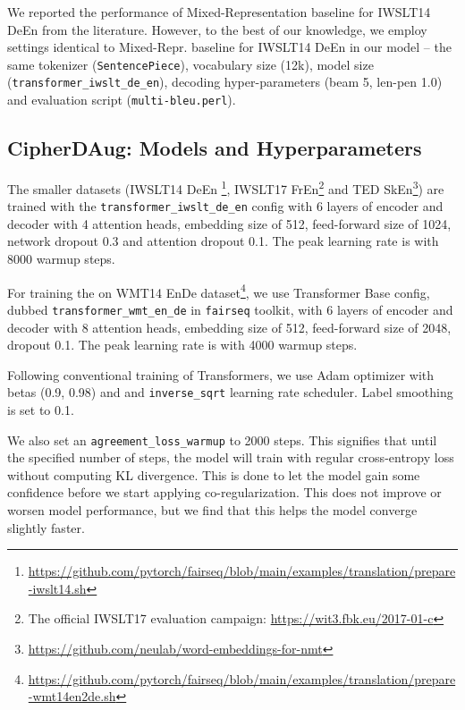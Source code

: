\documentclass[11pt]{article}
\begin{document}
We reported the performance of Mixed-Representation \cite{pmlr-v119-wu20e} baseline for IWSLT14 DeEn from the literature. However, to the best of our knowledge, we employ settings identical to Mixed-Repr. baseline for IWSLT14 DeEn in our model -- the same tokenizer (\texttt{SentencePiece}), vocabulary size (12k), model size (\texttt{transformer\_iwslt\_de\_en}), decoding hyper-parameters (beam 5, len-pen 1.0) and evaluation script (\texttt{multi-bleu.perl}).




\subsection{CipherDAug: Models and Hyperparameters}
\label{sec:modelhyper}
The smaller datasets (IWSLT14 DeEn \footnote{\url{https://github.com/pytorch/fairseq/blob/main/examples/translation/prepare-iwslt14.sh}}, IWSLT17 FrEn\footnote{The official IWSLT17 evaluation campaign: \url{https://wit3.fbk.eu/2017-01-c}} and TED SkEn\footnote{\url{https://github.com/neulab/word-embeddings-for-nmt}}) are trained with the \texttt{transformer\_iwslt\_de\_en} config with 6 layers of encoder and decoder with 4 attention heads, embedding size of 512, feed-forward size of 1024, network dropout 0.3 and attention dropout 0.1. The peak learning rate is  with 8000 warmup steps.

For training the on WMT14 EnDe dataset\footnote{\url{https://github.com/pytorch/fairseq/blob/main/examples/translation/prepare-wmt14en2de.sh}}, we use Transformer Base config, dubbed \texttt{transformer\_wmt\_en\_de} in \texttt{fairseq} toolkit, with 6 layers of encoder and decoder with 8 attention heads, embedding size of 512, feed-forward size of 2048, dropout 0.1. The peak learning rate is  with 4000 warmup steps.  


Following conventional training of Transformers, we use Adam optimizer with betas (0.9, 0.98) and  and \texttt{inverse\_sqrt} learning rate scheduler. Label smoothing is set to 0.1. 

We also set an \texttt{agreement\_loss\_warmup} to 2000 steps. This signifies that until the specified number of steps, the model will train with regular cross-entropy loss without computing KL divergence. This is done to let the model gain some confidence before we start applying co-regularization. This does not improve or worsen model performance, but we find that this helps the model converge slightly faster.
\end{document}
